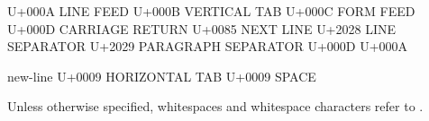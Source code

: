 \documentclass{wg21}
\begin{document}
\begin{addedblock}
\begin{bnf}
\br
    \textnormal{U+000A LINE FEED}\br
    \textnormal{U+000B VERTICAL TAB}\br
    \textnormal{U+000C FORM FEED}\br
    \textnormal{U+000D CARRIAGE RETURN}\br
    \textnormal{U+0085 NEXT LINE}\br
    \textnormal{U+2028 LINE SEPARATOR}\br
    \textnormal{U+2029 PARAGRAPH SEPARATOR}\br
    \textnormal{U+000D U+000A}
\end{bnf}

\begin{bnf}
    \br
    new-line\br
    \textnormal{U+0009 HORIZONTAL TAB}\br
    \textnormal{U+0009 SPACE}
\end{bnf}

Unless otherwise specified, whitespaces and whitespace characters refer to .

\end{addedblock}
%
%
%
\end{document}
